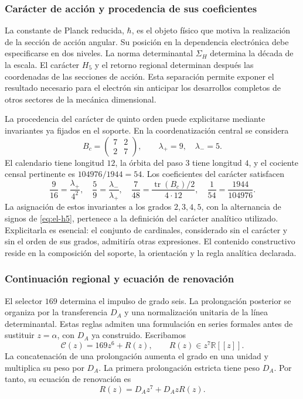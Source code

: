 \subsubsection{Carácter de acción y procedencia de sus coeficientes}
\label{sec:revision-planck}

La constante de Planck reducida, \(\hbar\), es el objeto físico que
motiva la realización de la sección de acción angular. Su posición en
la dependencia electrónica debe especificarse en dos niveles. La norma
determinantal \(\Sigma_H\) determina la década de la escala. El carácter
\(H_5\) y el retorno regional determinan después las coordenadas de las
secciones de acción. Esta separación permite exponer el resultado
necesario para el electrón sin anticipar los desarrollos completos de
otros sectores de la mecánica dimensional.

La procedencia del carácter de quinto orden puede explicitarse mediante
invariantes ya fijados en el soporte. En la coordenatización central se considera
\[
 B_c=\begin{pmatrix}7&2\\2&7\end{pmatrix},
 \qquad \lambda_+=9,\quad\lambda_-=5.
\]
El calendario tiene longitud \(12\), la órbita del paso \(3\) tiene
longitud \(4\), y el cociente censal pertinente es
\(104976/1944=54\). Los coeficientes del carácter satisfacen
\begin{equation}
 \frac9{16}=\frac{\lambda_+}{4^2},\quad
 \frac59=\frac{\lambda_-}{\lambda_+},\quad
 \frac7{48}=\frac{\operatorname{tr}(B_c)/2}{4\cdot12},\quad
 \frac1{54}=\frac{1944}{104976}.
 \label{eq:revision-h5-coeficientes}
\end{equation}
La asignación de estos invariantes a los grados \(2,3,4,5\), con la
alternancia de signos de \eqref{eq:el-h5}, pertenece a la definición del
carácter analítico utilizado. Explicitarla es esencial: el conjunto de
cardinales, considerado sin el carácter y sin el orden de sus grados,
admitiría otras expresiones. El contenido constructivo reside en la
composición del soporte, la orientación y la regla analítica declarada.

\subsubsection{Continuación regional y ecuación de renovación}

El selector \(169\) determina el impulso de grado seis. La prolongación
posterior se organiza por la transferencia \(D_A\) y una normalización
unitaria de la línea determinantal. Estas reglas admiten una formulación
en series formales antes de sustituir \(z=\alpha\), con \(D_A\) ya
construido. Escribamos
\[
 \mathscr C(z)=169z^6+R(z),\qquad R(z)\in z^7\mathbb R[[z]].
\]
La concatenación de una prolongación aumenta el grado en una unidad y
multiplica su peso por \(D_A\). La primera prolongación estricta tiene
peso \(D_A\). Por tanto, su ecuación de renovación es
\begin{equation}
 R(z)=D_Az^7+D_AzR(z).
 \label{eq:revision-renovacion}
\end{equation}

